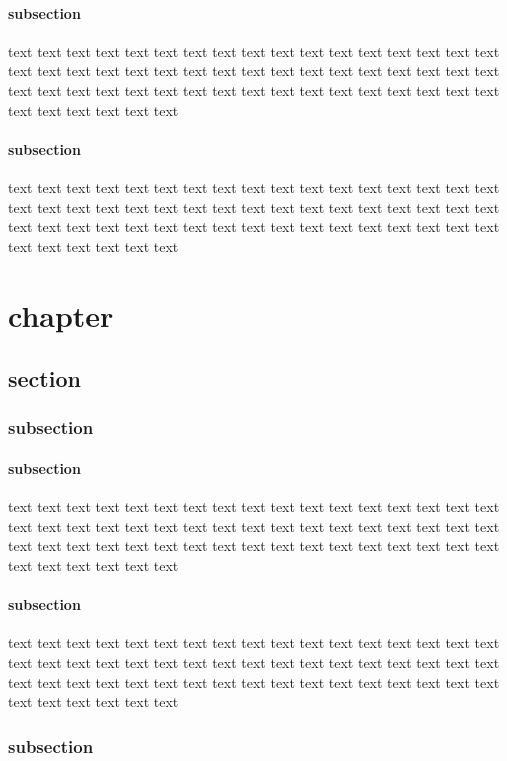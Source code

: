 \documentclass[report, backcover, english, nodocumentinfo]{upmethodology-document}
\begin{document}
				\subsubsection{subsection}
						text text text text text text text text text text text text text text text text text text text text text text text text text text text text text text text text text text text text text text text text text text text text text text text text text text text text text text text text text
				\subsubsection{subsection}
						text text text text text text text text text text text text text text text text text text text text text text text text text text text text text text text text text text text text text text text text text text text text text text text text text text text text text text text text text
	\chapter{chapter}
		\section{section}
			\subsection{subsection}
				\subsubsection{subsection}
						text text text text text text text text text text text text text text text text text text text text text text text text text text text text text text text text text text text text text text text text text text text text text text text text text text text text text text text text text
				\subsubsection{subsection}
						text text text text text text text text text text text text text text text text text text text text text text text text text text text text text text text text text text text text text text text text text text text text text text text text text text text text text text text text text
			\subsection{subsection}
\end{document}
